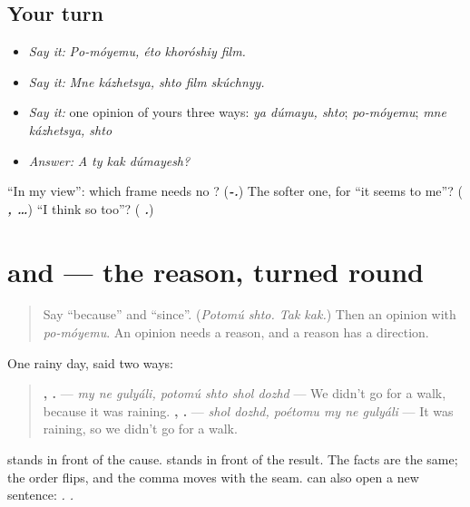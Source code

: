 \subsection*{Your turn}
\begin{itemize}
\raggedright
  \item \emph{Say it:} \emph{Po-móyemu, éto khoróshiy film.}
  \item \emph{Say it:} \emph{Mne kázhetsya, shto film skúchnyy.}
  \item \emph{Say it:} one opinion of yours three ways: \emph{ya dúmayu, shto}; \emph{po-móyemu}; \emph{mne kázhetsya, shto}
  \item \emph{Answer:} \emph{A ty kak dúmayesh?}
\end{itemize}

\begin{tcolorbox}[breakable,colback=teal!4,colframe=teal!35!black,title={Before you move on}]
\textquotedblleft{}In my view\textquotedblright{}: which frame needs no \emph{}? (\emph{\textbf{-.}}) The softer one, for \textquotedblleft{}it seems to me\textquotedblright{}? (\emph{\textbf{ ,  …}}) \textquotedblleft{}I think so too\textquotedblright{}? (\emph{\textbf{   .}})
\end{tcolorbox}
\section[\texorpdfstring{\ru{поэтому}, \ru{так} \ru{что} (poétomu, tak shto)}{поэтому, так что (poétomu, tak shto)}]{ and   — the reason, turned round}

\label{lesson:RU-C263-tak-chto}



\begin{quote}
Say \textquotedblleft{}because\textquotedblright{} and \textquotedblleft{}since\textquotedblright{}. (\emph{Potomú shto. Tak kak.}) Then an opinion with \emph{po-móyemu}. An opinion needs a reason, and a reason has a direction.
\end{quote}

\begin{grammarlens}[title={Grammar Lens: back to the cause, forward to the result}]
One rainy day, said two ways:

\begin{quote}
\textbf{  ,    .} — \emph{my ne gulyáli, potomú shto shol dozhd} — We didn't go for a walk, because it was raining. \textbf{ ,    .} — \emph{shol dozhd, poétomu my ne gulyáli} — It was raining, so we didn't go for a walk.
\end{quote}

\textbf{ } stands in front of the cause. \textbf{} stands in front of the result. The facts are the same; the order flips, and the comma moves with the seam. \textbf{} can also open a new sentence: \emph{ .    .}
\end{grammarlens}

